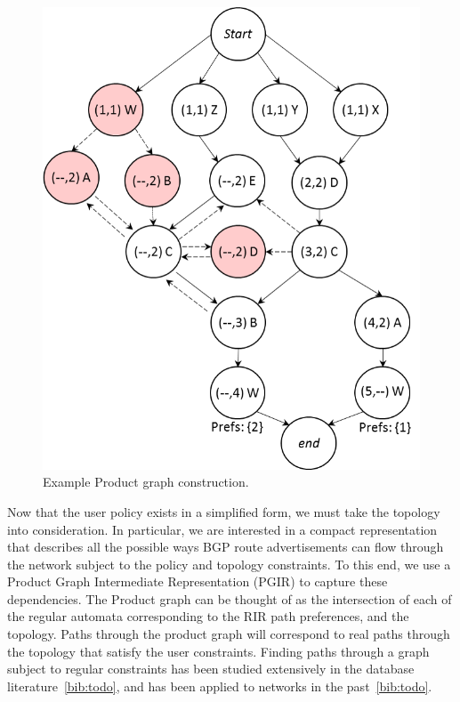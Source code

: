 \begin{figure}
\begin{minipage}[t]{.5\linewidth}
  \end{minipage}
  ~~
  ~~
  \begin{minipage}[t]{.5\linewidth}
  \vspace*{-1\baselineskip}
  \includegraphics[width=.8\columnwidth]{figures/productgraph}
  \end{minipage}

  \hrulefill

  \caption{Example Product graph construction.}
  \label{fig:example-compilation}
\end{figure}


Now that the user policy exists in a simplified form, we must take the topology into consideration. In particular, we are interested in a compact representation that describes all the possible ways BGP route advertisements can flow through the network subject to the policy and topology constraints. To this end, we use a Product Graph Intermediate Representation (PGIR) to capture these dependencies. The Product graph can be thought of as the intersection of each of the regular automata corresponding to the RIR path preferences, and the topology. Paths through the product graph will correspond to real paths through the topology that satisfy the user constraints. Finding paths through a graph subject to regular constraints has been studied extensively in the database literature~\ref{bib:todo}, and has been applied to networks in the past~\ref{bib:todo}.

